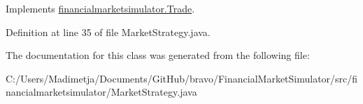 Implements \hyperlink{interfacefinancialmarketsimulator_1_1_trade_aa3cfc0cff8e9a08e48cfd70ae870cb8b}{financialmarketsimulator.\+Trade}.



Definition at line 35 of file Market\+Strategy.\+java.



The documentation for this class was generated from the following file\+:\begin{DoxyCompactItemize}
\item 
C\+:/\+Users/\+Madimetja/\+Documents/\+Git\+Hub/bravo/\+Financial\+Market\+Simulator/src/financialmarketsimulator/Market\+Strategy.\+java\end{DoxyCompactItemize}
